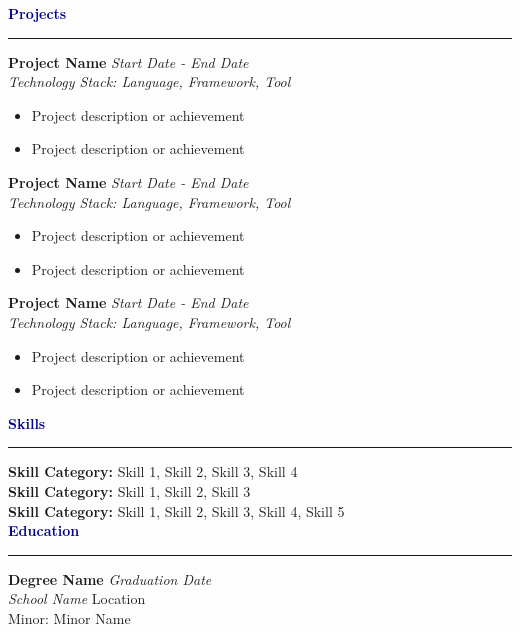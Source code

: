 \documentclass[11pt]{article}
\newcommand{\sectionheader}[1]{%
  \textcolor{darkblue}{\textbf{\large #1}}
  \vspace{-12pt}
  \hrule
  \vspace{8pt}
}
\newcommand{\projectentry}[3]{%
  \textbf{#1} \hfill \textit{#2}\\
  \textit{#3}\\
}
\newcommand{\educationentry}[4]{%
  \textbf{#1} \hfill \textit{#2}\\
  \textit{#3} \hfill #4\\
}
\newcommand{\skillcategory}[2]{%
  \textbf{#1:} #2\\
}
\begin{document}
\sectionheader{Projects}
\vspace{6pt}

\projectentry{Project Name}{Start Date - End Date}{Technology Stack: Language, Framework, Tool}
\begin{itemize}[left=18pt, noitemsep]
  \item Project description or achievement
  \item Project description or achievement
\end{itemize}
\vspace{8pt}

\projectentry{Project Name}{Start Date - End Date}{Technology Stack: Language, Framework, Tool}
\begin{itemize}[left=18pt, noitemsep]
  \item Project description or achievement
  \item Project description or achievement
\end{itemize}
\vspace{8pt}

\projectentry{Project Name}{Start Date - End Date}{Technology Stack: Language, Framework, Tool}
\begin{itemize}[left=18pt, noitemsep]
  \item Project description or achievement
  \item Project description or achievement
\end{itemize}

\sectionheader{Skills}
\vspace{6pt}

\skillcategory{Skill Category}{Skill 1, Skill 2, Skill 3, Skill 4}
\skillcategory{Skill Category}{Skill 1, Skill 2, Skill 3}
\skillcategory{Skill Category}{Skill 1, Skill 2, Skill 3, Skill 4, Skill 5}

\sectionheader{Education}
\vspace{6pt}

\educationentry{Degree Name}{Graduation Date}{School Name}{Location}
Minor: Minor Name
\end{document}
